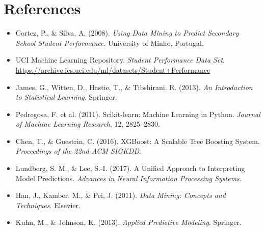 \documentclass[12pt, a4paper]{article}
\begin{document}
\section*{References}
\begin{itemize}[noitemsep]
    \item Cortez, P., \& Silva, A. (2008). \emph{Using Data Mining to Predict Secondary School Student Performance}. University of Minho, Portugal.
    \item UCI Machine Learning Repository. \emph{Student Performance Data Set}. \url{https://archive.ics.uci.edu/ml/datasets/Student+Performance}
    \item James, G., Witten, D., Hastie, T., \& Tibshirani, R. (2013). \emph{An Introduction to Statistical Learning}. Springer.
    \item Pedregosa, F. et al. (2011). Scikit-learn: Machine Learning in Python. \emph{Journal of Machine Learning Research}, 12, 2825--2830.
    \item Chen, T., \& Guestrin, C. (2016). XGBoost: A Scalable Tree Boosting System. \emph{Proceedings of the 22nd ACM SIGKDD}.
    \item Lundberg, S. M., \& Lee, S.-I. (2017). A Unified Approach to Interpreting Model Predictions. \emph{Advances in Neural Information Processing Systems}.
    \item Han, J., Kamber, M., \& Pei, J. (2011). \emph{Data Mining: Concepts and Techniques}. Elsevier.
    \item Kuhn, M., \& Johnson, K. (2013). \emph{Applied Predictive Modeling}. Springer.
\end{itemize}
\end{document}
